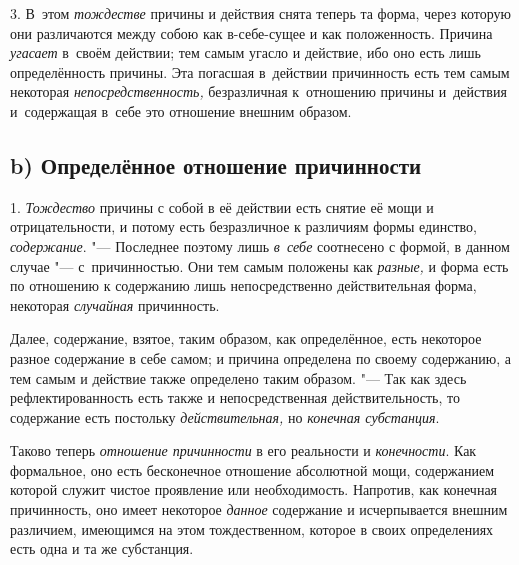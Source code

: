 3. В~этом {\em тождестве} причины и действия снята теперь та форма, через
которую они различаются между собою как в-себе-сущее и как положенность.
Причина {\em угасает} в~своём действии; тем самым угасло и действие, ибо оно
есть лишь определённость причины. Эта погасшая в~действии причинность есть тем
самым некоторая {\em непосредственность,} безразличная к~отношению причины
и~действия и~содержащая в~себе это отношение внешним образом.

\subsection%
[b) Определённое отношение причинности]%
{b) Определённое отношение причинности}

1. {\em Тождество} причины с собой в её действии есть снятие её мощи и
отрицательности, и потому есть безразличное к различиям формы единство,
{\em содержание}. "--- Последнее поэтому лишь {\em в~себе} соотнесено с формой,
в данном случае "--- с~причинностью. Они тем самым положены как {\em разные,} и
форма есть по отношению к содержанию лишь непосредственно действительная форма,
некоторая {\em случайная} причинность.

Далее, содержание, взятое, таким образом, как определённое, есть некоторое
разное содержание в себе самом; и причина определена по своему содержанию,
а тем самым и действие также определено таким образом. "--- Так как здесь
рефлектированность есть также и непосредственная действительность, то
содержание есть постольку {\em действительная,} но {\em конечная субстанция}.

Таково теперь {\em отношение причинности} в его реальности и {\em конечности}.
Как формальное, оно есть бесконечное отношение абсолютной мощи, содержанием
которой служит чистое проявление или необходимость. Напротив, как конечная
причинность, оно имеет некоторое {\em данное} содержание и исчерпывается
внешним различием, имеющимся на этом тождественном, которое в своих
определениях есть одна и та же субстанция.

